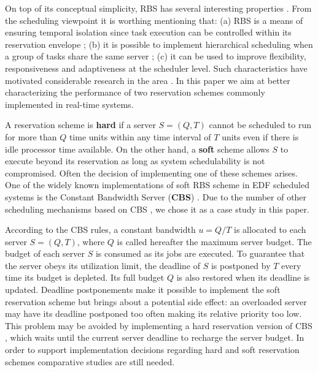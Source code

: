 \documentclass[times, 10pt,twocolumn]{article}
\begin{document}
On top of its conceptual simplicity, RBS has several interesting
properties \cite{steffens.ea03:resource}. From the scheduling
viewpoint it is worthing mentioning that: (a) RBS is a means of
ensuring temporal isolation since task execution can be controlled
within its reservation envelope
\cite{abeni.ea04:resource,mercer.ea94:processor,sprunt.ea89:aperiodic,spuri.ea96:scheduling};
(b) it is possible to implement hierarchical scheduling when a group
of tasks share the same server
\cite{davis.ea05:hierarchical,davis.ea08:investigation}; (c) it can be
used to improve flexibility, responsiveness and adaptiveness at the
scheduler level.  Such characteristics have motivated considerable
research in the area
\cite{abeni.ea99:adaptive,caccamo.ea00:capacity,caccamo.ea05:efficient,oliveira.ea08:dynamic,oliveira.ea09:dynamic,lin.ea05:improving}.
In this paper we aim at better characterizing the performance of two
reservation schemes commonly implemented in real-time systems.

A reservation scheme is \textbf{hard} if a server
$S = (Q,T)$ cannot be scheduled to run for more than $Q$ time
units within any time interval of $T$ units even if there is idle
processor time available. On the other hand, a \textbf{soft} scheme
allows $S$ to execute beyond its reservation as long as system
schedulability is not compromised. Often the decision of implementing
one of these schemes arises. One of the widely known implementations
of soft RBS scheme in EDF scheduled systems is the Constant Bandwidth
Server (\textbf{CBS}) \cite{abeni.ea04:resource}.  Due to the number
of other scheduling mechanisms based on CBS
\cite{abeni.ea05:qos,caccamo.ea00:capacity,caccamo.ea05:efficient,lipari.ea00:greedy},
we chose it as a case study in this paper.

According to the CBS rules, a constant bandwidth $u = Q/T$ is
allocated to each server $S = (Q,T)$, where $Q$ is called hereafter
the maximum server budget. The budget of each server $S$ is consumed
as its jobs are executed. To guarantee that the server obeys its
utilization limit, the deadline of $S$ is postponed by $T$ every time
its budget is depleted.  Its full budget $Q$ is also restored when its
deadline is updated.  Deadline postponements make it possible to
implement the soft reservation scheme but brings about a potential
side effect: an overloaded server may have its deadline postponed too
often making its relative priority too low.  This problem may be
avoided by implementing a hard reservation version of CBS
\cite{buttazzo05:soft}, which waits until the current server deadline
to recharge the server budget. In order to support implementation
decisions regarding hard and soft reservation schemes comparative
studies are still needed.
\end{document}
